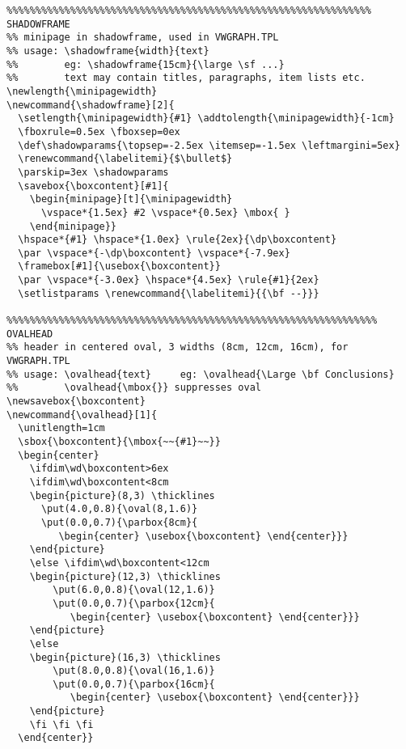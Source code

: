 {\begin{verbatim}
%%%%%%%%%%%%%%%%%%%%%%%%%%%%%%%%%%%%%%%%%%%%%%%%%%%%%%%%%%%%%%% SHADOWFRAME
%% minipage in shadowframe, used in VWGRAPH.TPL 
%% usage: \shadowframe{width}{text}
%%        eg: \shadowframe{15cm}{\large \sf ...}
%%        text may contain titles, paragraphs, item lists etc.
\newlength{\minipagewidth}
\newcommand{\shadowframe}[2]{
  \setlength{\minipagewidth}{#1} \addtolength{\minipagewidth}{-1cm}
  \fboxrule=0.5ex \fboxsep=0ex
  \def\shadowparams{\topsep=-2.5ex \itemsep=-1.5ex \leftmargini=5ex}
  \renewcommand{\labelitemi}{$\bullet$}
  \parskip=3ex \shadowparams 
  \savebox{\boxcontent}[#1]{         
    \begin{minipage}[t]{\minipagewidth}
      \vspace*{1.5ex} #2 \vspace*{0.5ex} \mbox{ } 
    \end{minipage}}
  \hspace*{#1} \hspace*{1.0ex} \rule{2ex}{\dp\boxcontent}  
  \par \vspace*{-\dp\boxcontent} \vspace*{-7.9ex} 
  \framebox[#1]{\usebox{\boxcontent}}  
  \par \vspace*{-3.0ex} \hspace*{4.5ex} \rule{#1}{2ex}
  \setlistparams \renewcommand{\labelitemi}{{\bf --}}}

%%%%%%%%%%%%%%%%%%%%%%%%%%%%%%%%%%%%%%%%%%%%%%%%%%%%%%%%%%%%%%%% OVALHEAD
%% header in centered oval, 3 widths (8cm, 12cm, 16cm), for VWGRAPH.TPL
%% usage: \ovalhead{text}     eg: \ovalhead{\Large \bf Conclusions}
%%        \ovalhead{\mbox{}} suppresses oval
\newsavebox{\boxcontent}
\newcommand{\ovalhead}[1]{
  \unitlength=1cm
  \sbox{\boxcontent}{\mbox{~~{#1}~~}}
  \begin{center}
    \ifdim\wd\boxcontent>6ex 
    \ifdim\wd\boxcontent<8cm 
    \begin{picture}(8,3) \thicklines     
      \put(4.0,0.8){\oval(8,1.6)} 
      \put(0.0,0.7){\parbox{8cm}{
         \begin{center} \usebox{\boxcontent} \end{center}}}
    \end{picture}
    \else \ifdim\wd\boxcontent<12cm 
    \begin{picture}(12,3) \thicklines     
        \put(6.0,0.8){\oval(12,1.6)} 
        \put(0.0,0.7){\parbox{12cm}{
           \begin{center} \usebox{\boxcontent} \end{center}}}
    \end{picture}
    \else
    \begin{picture}(16,3) \thicklines     
        \put(8.0,0.8){\oval(16,1.6)} 
        \put(0.0,0.7){\parbox{16cm}{
           \begin{center} \usebox{\boxcontent} \end{center}}}
    \end{picture}
    \fi \fi \fi
  \end{center}} 


\end{verbatim}}
